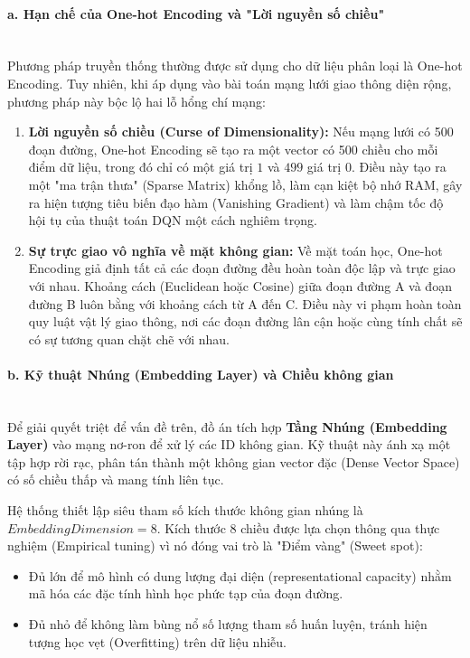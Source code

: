\paragraph{a. Hạn chế của One-hot Encoding và "Lời nguyền số chiều"} \mbox{} \\
Phương pháp truyền thống thường được sử dụng cho dữ liệu phân loại là One-hot Encoding. Tuy nhiên, khi áp dụng vào bài toán mạng lưới giao thông diện rộng, phương pháp này bộc lộ hai lỗ hổng chí mạng:
\begin{enumerate}
    \item \textbf{Lời nguyền số chiều (Curse of Dimensionality):} Nếu mạng lưới có 500 đoạn đường, One-hot Encoding sẽ tạo ra một vector có 500 chiều cho mỗi điểm dữ liệu, trong đó chỉ có một giá trị $1$ và $499$ giá trị $0$. Điều này tạo ra một "ma trận thưa" (Sparse Matrix) khổng lồ, làm cạn kiệt bộ nhớ RAM, gây ra hiện tượng tiêu biến đạo hàm (Vanishing Gradient) và làm chậm tốc độ hội tụ của thuật toán DQN một cách nghiêm trọng.
    \item \textbf{Sự trực giao vô nghĩa về mặt không gian:} Về mặt toán học, One-hot Encoding giả định tất cả các đoạn đường đều hoàn toàn độc lập và trực giao với nhau. Khoảng cách (Euclidean hoặc Cosine) giữa đoạn đường A và đoạn đường B luôn bằng với khoảng cách từ A đến C. Điều này vi phạm hoàn toàn quy luật vật lý giao thông, nơi các đoạn đường lân cận hoặc cùng tính chất sẽ có sự tương quan chặt chẽ với nhau.
\end{enumerate}

\paragraph{b. Kỹ thuật Nhúng (Embedding Layer) và Chiều không gian} \mbox{} \\
Để giải quyết triệt để vấn đề trên, đồ án tích hợp \textbf{Tầng Nhúng (Embedding Layer)} vào mạng nơ-ron để xử lý các ID không gian. Kỹ thuật này ánh xạ một tập hợp rời rạc, phân tán thành một không gian vector đặc (Dense Vector Space) có số chiều thấp và mang tính liên tục.

Hệ thống thiết lập siêu tham số kích thước không gian nhúng là $Embedding Dimension = 8$. Kích thước 8 chiều được lựa chọn thông qua thực nghiệm (Empirical tuning) vì nó đóng vai trò là "Điểm vàng" (Sweet spot):
\begin{itemize}
    \item Đủ lớn để mô hình có dung lượng đại diện (representational capacity) nhằm mã hóa các đặc tính hình học phức tạp của đoạn đường.
    \item Đủ nhỏ để không làm bùng nổ số lượng tham số huấn luyện, tránh hiện tượng học vẹt (Overfitting) trên dữ liệu nhiễu.
\end{itemize}

